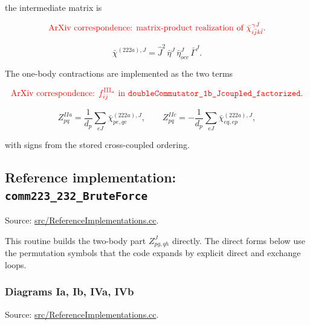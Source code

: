 \documentclass[
]{article}
\begin{document}
the intermediate matrix is

\begin{equation}
{\color{red}\text{ArXiv correspondence: matrix-product realization of }\bar\chi^{\gamma J}_{i\bar j k\bar l}.}
\end{equation}

\begin{equation}
\bar\chi^{(222a),J}=\hat J^2\,\bar\eta^J\,\bar\eta^J_{occ}\,\bar\Gamma^J .
\end{equation}

The one-body contractions are implemented as the two terms

\begin{equation}
{\color{red}\text{ArXiv correspondence: }f^{\mathrm{III}_a}_{ij}\text{ in }\texttt{doubleCommutator\_1b\_Jcoupled\_factorized}.}
\end{equation}

\begin{equation}
Z^{IIa}_{pq}=\frac{1}{d_p}\sum_{eJ}\bar\chi^{(222a),J}_{pe,qe},
\qquad
Z^{IIc}_{pq}=-\frac{1}{d_p}\sum_{eJ}\bar\chi^{(222a),J}_{eq,ep},
\end{equation}

with signs from the stored cross-coupled ordering.

\subsection{\texorpdfstring{Reference implementation:
\texttt{comm223\_232\_BruteForce}}{Reference implementation: comm223\_232\_BruteForce}}\label{reference-implementation-comm223_232_bruteforce}

Source:
\href{../src/ReferenceImplementations.cc\#L7359-L10303}{src/ReferenceImplementations.cc}.

This routine builds the two-body part \(Z^J_{pg,qh}\) directly. The
direct forms below use the permutation symbols that the code expands by
explicit direct and exchange loops.

\subsubsection{Diagrams Ia, Ib, IVa, IVb}\label{diagrams-ia-ib-iva-ivb}

Source:
\href{../src/ReferenceImplementations.cc\#L7386-L7818}{src/ReferenceImplementations.cc}.
\end{document}
